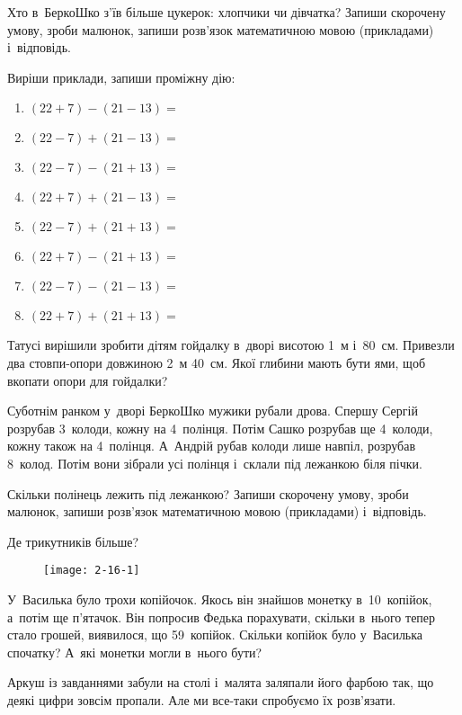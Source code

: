 Хто в~БеркоШко з’їв більше цукерок: хлопчики чи дівчатка?
Запиши скорочену умову, зроби малюнок, запиши розв’язок
математичною мовою (прикладами) і~відповідь.


\problem
Виріши приклади, запиши проміжну дію:
\begin{multicols}{2}
    \begin{enumerate}
        \item $(22 + 7) - (21 - 13) =$
        \item $(22 - 7) + (21 - 13) =$
        \item $(22 - 7) - (21 + 13) =$
        \item $(22 + 7) + (21 - 13) =$
        \item $(22 - 7) + (21 + 13) =$
        \item $(22 + 7) - (21 + 13) =$
        \item $(22 - 7) - (21 - 13) =$
        \item $(22 + 7) + (21 + 13) =$
    \end{enumerate}
\end{multicols}


\problem
Татусі вирішили зробити дітям гойдалку в~дворі висотою 1~м і~80~см.
Привезли два стовпи-опори довжиною 2~м 40~см.
Якої глибини мають бути ями, щоб вкопати опори для гойдалки?


\problem
Суботнім ранком у~дворі БеркоШко мужики рубали дрова.
Спершу Сергій розрубав 3~колоди, кожну на 4~полінця.
Потім Сашко розрубав ще 4~колоди, кожну також на 4~полінця.
А~Андрій рубав колоди лише навпіл, розрубав 8~колод.
Потім вони зібрали усі полінця і~склали під лежанкою біля пічки.

Скільки полінець лежить під лежанкою?
Запиши скорочену умову, зроби малюнок,
запиши розв’язок математичною мовою (прикладами) і~відповідь.


\problem
Де трикутників більше?

\begin{figure}[h]
    \centering
    \texttt{[image: 2-16-1]}
\end{figure}


\problem
У~Василька було трохи копійочок.
Якось він знайшов монетку в~10~копійок, а~потім ще п’ятачок.
Він попросив Федька порахувати, скільки в~нього тепер стало грошей,
виявилося, що 59~копійок.
Скільки копійок було у~Василька спочатку?
А~які монетки могли в~нього бути? 


\problem
Аркуш із завданнями забули на столі і~малята заляпали його фарбою так,
що деякі цифри зовсім пропали.
Але ми все-таки спробуємо їх розв’язати.

